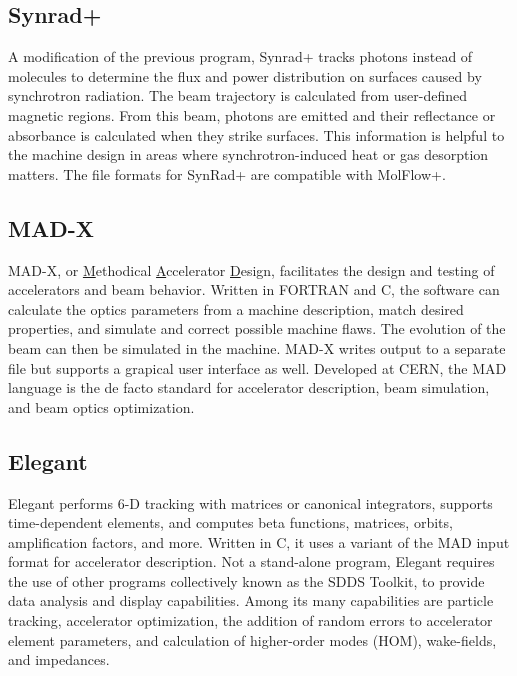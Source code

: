 \subsection{Synrad+}

A modification of the previous program, Synrad+ tracks photons instead of molecules to determine the flux and power distribution on surfaces caused by synchrotron radiation.  The beam trajectory is calculated from user-defined magnetic regions.  From this beam, photons are emitted and their reflectance or absorbance is calculated when they strike surfaces. This information is helpful to the machine design in areas where synchrotron-induced heat or gas desorption matters.  The file formats for SynRad+ are compatible with MolFlow+.

\subsection{MAD-X}
MAD-X, or \underline{M}ethodical \underline{A}ccelerator \underline{D}esign, facilitates the design and testing of accelerators and beam behavior.  Written in FORTRAN and C, the software can calculate the optics parameters from a machine description, match desired properties, and simulate and correct possible machine flaws.  The evolution of the beam can then be simulated in the machine.  MAD-X writes output to a separate file but supports a grapical user interface as well.  Developed at CERN, the MAD language is the de facto standard for accelerator description, beam simulation, and beam optics optimization.


\subsection{Elegant}

Elegant performs 6-D tracking with matrices or canonical integrators, supports time-dependent elements, and computes beta functions, matrices, orbits, amplification factors, and more.  Written in C, it uses a variant of the MAD input format for accelerator description.  Not a stand-alone program, Elegant requires the use of other programs collectively known as the SDDS Toolkit, to provide data analysis and display capabilities.  Among its many capabilities are particle tracking, accelerator optimization, the addition of random errors to accelerator element parameters, and calculation of higher-order modes (HOM), wake-fields, and impedances.
